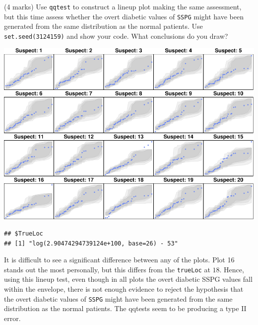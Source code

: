 \documentclass[9pt,letter]{article}
\newenvironment{Shaded}{\begin{snugshade}}{\end{snugshade}}
\newcommand{\KeywordTok}[1]{\textcolor[rgb]{0.13,0.29,0.53}{\textbf{#1}}}
\newcommand{\DataTypeTok}[1]{\textcolor[rgb]{0.13,0.29,0.53}{#1}}
\newcommand{\DecValTok}[1]{\textcolor[rgb]{0.00,0.00,0.81}{#1}}
\newcommand{\StringTok}[1]{\textcolor[rgb]{0.31,0.60,0.02}{#1}}
\newcommand{\OtherTok}[1]{\textcolor[rgb]{0.56,0.35,0.01}{#1}}
\newcommand{\OperatorTok}[1]{\textcolor[rgb]{0.81,0.36,0.00}{\textbf{#1}}}
\newcommand{\NormalTok}[1]{#1}
\begin{document}
\item 

(4 marks) Use \texttt{qqtest} to construct a lineup plot making the same
assessment, but this time assess whether the overt diabetic values of
\texttt{SSPG} might have been generated from the same distribution as
the normal patients. Use \texttt{set.seed(3124159)} and show your code.
What conclusions do you draw?

\begin{Shaded}
\end{Shaded}

\includegraphics{a4_solutions_files/figure-latex/unnamed-chunk-6-1.pdf}

\begin{verbatim}
## $TrueLoc
## [1] "log(2.90474294739124e+100, base=26) - 53"
\end{verbatim}

It is difficult to see a significant difference between any of the
plots. Plot 16 stands out the most personally, but this differs from the
\texttt{trueLoc} at \(18\). Hence, using this lineup test, even though
in all plots the overt diabetic SSPG values fall within the envelope,
there is not enough evidence to reject the hypothesis that the overt
diabetic values of \texttt{SSPG} might have been generated from the same
distribution as the normal patients. The qqtests seem to be producing a
type II error.
\end{document}
